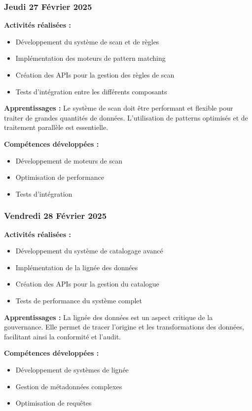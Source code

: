 \documentclass[12pt,a4paper]{article}
\begin{document}
\subsubsection{Jeudi 27 Février 2025}
\textbf{Activités réalisées :}
\begin{itemize}
    \item Développement du système de scan et de règles
    \item Implémentation des moteurs de pattern matching
    \item Création des APIs pour la gestion des règles de scan
    \item Tests d'intégration entre les différents composants
\end{itemize}

\textbf{Apprentissages :}
Le système de scan doit être performant et flexible pour traiter de grandes quantités de données. L'utilisation de patterns optimisés et de traitement parallèle est essentielle.

\textbf{Compétences développées :}
\begin{itemize}
    \item Développement de moteurs de scan
    \item Optimisation de performance
    \item Tests d'intégration
\end{itemize}

\subsubsection{Vendredi 28 Février 2025}
\textbf{Activités réalisées :}
\begin{itemize}
    \item Développement du système de catalogage avancé
    \item Implémentation de la lignée des données
    \item Création des APIs pour la gestion du catalogue
    \item Tests de performance du système complet
\end{itemize}

\textbf{Apprentissages :}
La lignée des données est un aspect critique de la gouvernance. Elle permet de tracer l'origine et les transformations des données, facilitant ainsi la conformité et l'audit.

\textbf{Compétences développées :}
\begin{itemize}
    \item Développement de systèmes de lignée
    \item Gestion de métadonnées complexes
    \item Optimisation de requêtes
\end{itemize}
\end{document}
